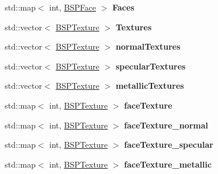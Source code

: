 \begin{DoxyCompactItemize}
\item 
std\+::map$<$ int, \hyperlink{class_b_s_p_face}{B\+S\+P\+Face} $>$ {\bfseries Faces}\hypertarget{class_c_quake3_b_s_p_a3abb90858963d1d795b5e5e33a152f92}{}\label{class_c_quake3_b_s_p_a3abb90858963d1d795b5e5e33a152f92}

\item 
std\+::vector$<$ \hyperlink{struct_b_s_p_texture}{B\+S\+P\+Texture} $>$ {\bfseries Textures}\hypertarget{class_c_quake3_b_s_p_ae0e924f8e1ec9d4e911e4d9bdce5a1dd}{}\label{class_c_quake3_b_s_p_ae0e924f8e1ec9d4e911e4d9bdce5a1dd}

\item 
std\+::vector$<$ \hyperlink{struct_b_s_p_texture}{B\+S\+P\+Texture} $>$ {\bfseries normal\+Textures}\hypertarget{class_c_quake3_b_s_p_a83c453f608fa2799750da3705309aba4}{}\label{class_c_quake3_b_s_p_a83c453f608fa2799750da3705309aba4}

\item 
std\+::vector$<$ \hyperlink{struct_b_s_p_texture}{B\+S\+P\+Texture} $>$ {\bfseries specular\+Textures}\hypertarget{class_c_quake3_b_s_p_a38864b6aeb49897e7e836ca3ca306913}{}\label{class_c_quake3_b_s_p_a38864b6aeb49897e7e836ca3ca306913}

\item 
std\+::vector$<$ \hyperlink{struct_b_s_p_texture}{B\+S\+P\+Texture} $>$ {\bfseries metallic\+Textures}\hypertarget{class_c_quake3_b_s_p_acb1e64479b9861f90d79d4e84c10f725}{}\label{class_c_quake3_b_s_p_acb1e64479b9861f90d79d4e84c10f725}

\item 
std\+::map$<$ int, \hyperlink{struct_b_s_p_texture}{B\+S\+P\+Texture} $>$ {\bfseries face\+Texture}\hypertarget{class_c_quake3_b_s_p_adf1d74f1aa4e4bef4d0f467a6eaf863f}{}\label{class_c_quake3_b_s_p_adf1d74f1aa4e4bef4d0f467a6eaf863f}

\item 
std\+::map$<$ int, \hyperlink{struct_b_s_p_texture}{B\+S\+P\+Texture} $>$ {\bfseries face\+Texture\+\_\+normal}\hypertarget{class_c_quake3_b_s_p_a93aa930777a9843962fe40811ae0c050}{}\label{class_c_quake3_b_s_p_a93aa930777a9843962fe40811ae0c050}

\item 
std\+::map$<$ int, \hyperlink{struct_b_s_p_texture}{B\+S\+P\+Texture} $>$ {\bfseries face\+Texture\+\_\+specular}\hypertarget{class_c_quake3_b_s_p_a1ccd0446e9df6e7e6ec5f8f5c7ef551b}{}\label{class_c_quake3_b_s_p_a1ccd0446e9df6e7e6ec5f8f5c7ef551b}

\item 
std\+::map$<$ int, \hyperlink{struct_b_s_p_texture}{B\+S\+P\+Texture} $>$ {\bfseries face\+Texture\+\_\+metallic}\hypertarget{class_c_quake3_b_s_p_aef04d61cd502bb4ff5b7baadaf1e2425}{}\label{class_c_quake3_b_s_p_aef04d61cd502bb4ff5b7baadaf1e2425}


\end{DoxyCompactItemize}
